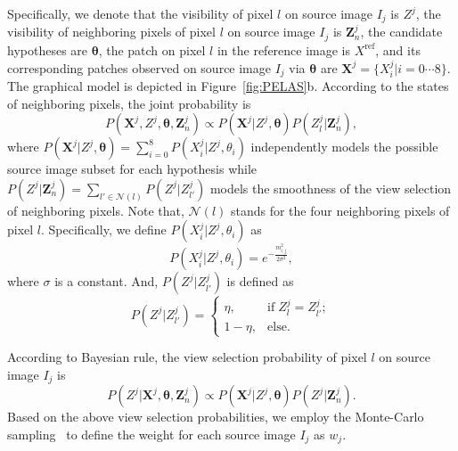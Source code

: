 \documentclass[letterpaper]{article} %
\begin{document}
Specifically, we denote that the visibility of pixel $l$ on source image $I_{j}$ is $Z^{j}$, the visibility of neighboring pixels of pixel $l$ on source image $I_{j}$ is $\boldsymbol{Z}_{n}^{j}$, the candidate hypotheses are $\boldsymbol{\theta}$, the patch on pixel $l$ in the reference image is $X^\text{ref}$, and its corresponding patches observed on source image $I_{j}$ via $\boldsymbol{\theta}$ are $\boldsymbol{X}^{j}=\{X_{i}^{j}|i=0\cdots8\}$. The graphical model is depicted in Figure~\ref{fig:PELAS}b. According to the states of neighboring pixels, %
the joint probability is
\begin{equation}
P(\boldsymbol{X}^{j},Z^{j},\boldsymbol{\theta},\boldsymbol{Z}_{n}^{j}){\propto}P(\boldsymbol{X}^{j}|Z^{j},\boldsymbol{\theta})P(Z_{l}^{j}|\boldsymbol{Z}_{n}^{j}),
\end{equation}
where $P(\boldsymbol{X}^{j}|Z^{j},\boldsymbol{\theta})=\sum_{i=0}^{8}P(X_{i}^{j}|Z^{j},\theta_{i})$ independently models the possible source image subset for each hypothesis while $P(Z^{j}|\boldsymbol{Z}_{n}^{j})=\sum_{l'\in \mathcal{N}(l)} P(Z^{j}|Z_{l'}^{j})$ models the smoothness of the view selection of neighboring pixels. Note that, $\mathcal{N}(l)$ stands for the four neighboring pixels of pixel $l$. Specifically, we define $P(X_{i}^{j}|Z^{j},\theta_{i})$ as
\begin{equation}
P(X_{i}^{j}|Z^{j},\theta_{i})=e^{-\frac{m_{i,j}^2}{2\sigma^2}},
\end{equation}
where $\sigma$ is a constant. And, $P(Z^{j}|Z_{l'}^{j})$ is defined as
\begin{equation}
P(Z^{j}|Z_{l'}^{j})=\left\{ \begin{array}{ll}
\eta, & \textrm{if}\;Z_{l}^{j}=Z_{l'}^{j}; \\
1-\eta, & {\textrm{else.}}
\end{array} \right.
\end{equation}

According to Bayesian rule, the view selection probability of pixel $l$ on source image $I_{j}$ is
\begin{equation}
P(Z^{j}|\boldsymbol{X}^{j},\boldsymbol{\theta},\boldsymbol{Z}_{n}^{j}){\propto}P(\boldsymbol{X}^{j}|Z^{j},\boldsymbol{\theta})P(Z^{j}|\boldsymbol{Z}_{n}^{j}).
\end{equation}
Based on the above view selection probabilities, we employ the Monte-Carlo sampling~\cite{Bishop2006PRML} to define the weight for each source image $I_{j}$ as $w_{j}$.
\end{document}
